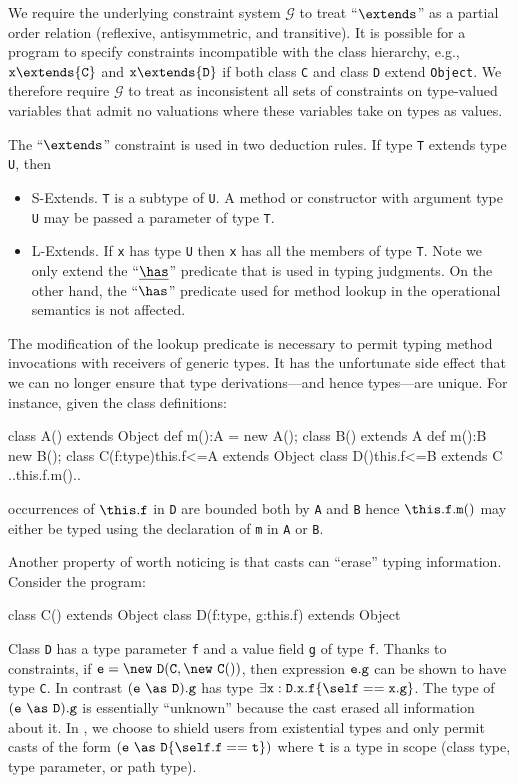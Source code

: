 {We require the underlying constraint system $\mathcal{G}$ to treat ``$\extends$'' as a partial order relation (reflexive, antisymmetric, and transitive). It is possible for a program to specify constraints incompatible with the class hierarchy, e.g., ${\tt x}\extends{\tt C}$ and ${\tt x}\extends{\tt D}$ if both class {\tt C} and class {\tt D} extend {\tt Object}. We therefore require $\mathcal{G}$ to treat as inconsistent all sets of constraints on type-valued variables that admit no valuations where these variables take on types as values.

The ``$\extends$'' constraint is used in two deduction rules. If
type {\tt T} extends type {\tt U}, then
\begin{itemize}
\item{\sc S-Extends}. {\tt T} is a subtype of {\tt U}. A method or constructor with argument type {\tt U} may be passed a parameter of type {\tt T}.
\item{\sc L-Extends}. If {\tt x} has type {\tt U} then {\tt x} has all the members of type {\tt T}. Note we only extend the ``$\underline\has$'' predicate that is used in typing judgments. On the other hand, the ``$\has$'' predicate used for method lookup in the operational semantics is not affected.
\end{itemize}

The modification of the lookup predicate is
necessary to permit typing method invocations with receivers of
generic types. It has the unfortunate side effect that we can no
longer ensure that type derivations---and hence types---are unique.
For instance, given the class definitions:
%
\begin{xten}
class A() extends Object { def m():A = new A(); }
class B() extends A { def m():B new B(); }
class C(f:type){this.f<=A} extends Object {}
class D(){this.f<=B} extends C { ..this.f.m().. }
\end{xten}
%
occurrences of $\this.{\tt f}$ in {\tt D} are bounded both by {\tt A} and {\tt B} hence 
$\this.{\tt f}.{\tt m}()$ may either be typed using the declaration of {\tt m} in {\tt A} or {\tt B}.

Another property of \FXG{} worth noticing is that casts can ``erase'' typing information.
Consider the program:
\begin{xten}
class C() extends Object {}
class D(f:type, g:this.f) extends Object {}
\end{xten}
Class {\tt D} has a type parameter {\tt f} and a value field {\tt g} of type {\tt f}.
Thanks to constraints, if
${\tt e}=\new~{\tt D}({\tt C},\new~{\tt C}())$,
then expression ${\tt e}.{\tt g}$ can be shown to
have type {\tt C}.
In contrast $({\tt e}~\as~{\tt D}).{\tt g}$ has type
$\exists {\tt x}:{\tt D}.{\tt x}.{\tt f}\{\self=={\tt x.g}\}$.
The type of $({\tt e}~\as~{\tt D}).{\tt g}$ is essentially ``unknown''
because the cast erased all information about it. In \Xten, we choose to shield users from existential types and only permit casts of the form $({\tt e}~\as~{\tt D}\{\self.{\tt f}=={\tt t}\})$ where {\tt t} is a type in scope (class type, type parameter, or path type).


}
